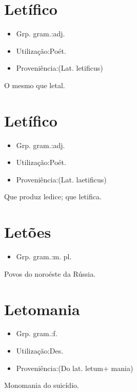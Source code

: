\section{Letífico}
\begin{itemize}
\item {Grp. gram.:adj.}
\end{itemize}
\begin{itemize}
\item {Utilização:Poét.}
\end{itemize}
\begin{itemize}
\item {Proveniência:(Lat. \textunderscore letificus\textunderscore )}
\end{itemize}
O mesmo que \textunderscore letal\textunderscore .
\section{Letífico}
\begin{itemize}
\item {Grp. gram.:adj.}
\end{itemize}
\begin{itemize}
\item {Utilização:Poét.}
\end{itemize}
\begin{itemize}
\item {Proveniência:(Lat. laetificus)}
\end{itemize}
Que produz ledice; que letifica.
\section{Letões}
\begin{itemize}
\item {Grp. gram.:m. pl.}
\end{itemize}
Povos do noroéste da Rússia.
\section{Letomania}
\begin{itemize}
\item {Grp. gram.:f.}
\end{itemize}
\begin{itemize}
\item {Utilização:Des.}
\end{itemize}
\begin{itemize}
\item {Proveniência:(Do lat. \textunderscore letum\textunderscore  + \textunderscore mania\textunderscore )}
\end{itemize}
Monomania do suicídio.
